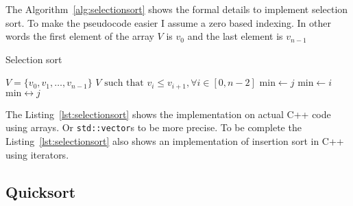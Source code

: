 The Algorithm~\ref{alg:selectionsort} shows the formal details to implement selection sort.
To make the pseudocode easier I assume a zero based indexing.
In other words the first element of the array $V$ is $v_0$ and the last element is $v_{n-1}$

\begin{algorithm}[H]
\caption{Selection sort}
\label{alg:selectionsort}
\begin{algorithmic}[1] %
\Require $V = \{ v_0, v_1, \ldots, v_{n-1} \} $ 
\Ensure $V\text{ such that } v_i \leq v_{i + 1}, \forall i \in [0, n-2]$ 
    \State $\text{min} \gets j$ 
     
            \State $\text{min} \gets i$
        \EndIf
    \EndFor
     
        \State $\text{min} \leftrightarrow j$ 
    \EndIf
\EndFor
\EndProcedure
\end{algorithmic}
\end{algorithm}

The Listing~\ref{lst:selectionsort} shows the implementation on actual C++ code using arrays. Or \texttt{std::vector}s to be more precise.
To be complete the Listing~\ref{lst:selectionsort} also shows an implementation of   insertion sort in C++ using iterators.


 
\subsection{Quicksort}

